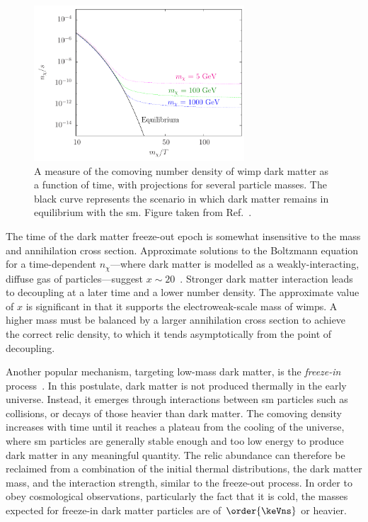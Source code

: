 \begin{figure}[htbp]
    \centering
    \includegraphics[width=0.7\textwidth]{figures/dm_abundance.pdf}
    \caption[A measure of the comoving number density of WIMP dark matter as a function of time, with projections for several particle masses]{A measure of the comoving number density of \acrshort{wimp} dark matter as a function of time, with projections for several particle masses. The black curve represents the scenario in which dark matter remains in equilibrium with the \acrlong{sm}. Figure taken from Ref.~.}
    \label{fig:theory_dm_abundance}
\end{figure}

The time of the dark matter freeze-out epoch is somewhat insensitive to the mass and annihilation cross section. Approximate solutions to the Boltzmann equation for a time-dependent $n_{\chi}$---where dark matter is modelled as a weakly-interacting, diffuse gas of particles---suggest $x \sim \text{20}$~\cite{Lisanti:2016jxe,Bender:2012gc}. Stronger dark matter interaction leads to decoupling at a later time and a lower number density. The approximate value of $x$ is significant in that it supports the electroweak-scale mass of \acrshort{wimp}s. A higher mass must be balanced by a larger annihilation cross section to achieve the correct relic density, to which it tends asymptotically from the point of decoupling.

Another popular mechanism, targeting low-mass dark matter, is the \emph{freeze-in} process~\cite{Hall:2009bx,Krnjaic:2017tio}. In this postulate, dark matter is not produced thermally in the early universe. Instead, it emerges through interactions between \acrshort{sm} particles such as collisions, or decays of those heavier than dark matter. The comoving density increases with time until it reaches a plateau from the cooling of the universe, where \acrshort{sm} particles are generally stable enough and too low energy to produce dark matter in any meaningful quantity. The relic abundance can therefore be reclaimed from a combination of the initial thermal distributions, the dark matter mass, and the interaction strength, similar to the freeze-out process. In order to obey cosmological observations, particularly the fact that it is cold, the masses expected for freeze-in dark matter particles are of $\order{\keVns}$ or heavier.


